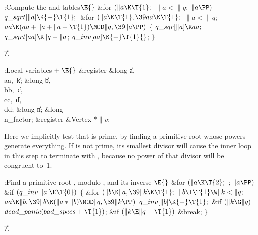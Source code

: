 \B{}:Compute the  and  tables\X${}\E{}$\6
\&{for} ${}(\|a\K\T{1};{}$ ${}\|a<\|q;{}$ ${}\|a\PP){}$\1\5
${}\\{q\_sqrt}[\|a]\K{-}\T{1};{}$\2\6
\&{for} ${}(\|a\K\T{1},\39\\{aa}\K\T{1};{}$ ${}\|a<\|q;{}$ ${}\\{aa}\K(\\{aa}+%
\|a+\|a+\T{1})\MOD\|q,\39\|a\PP){}$\5
${}\{{}$\1\6
${}\\{q\_sqr}[\|a]\K\\{aa};{}$\6
${}\\{q\_sqrt}[\\{aa}]\K\|q-\|a{}$;\6
${}\\{q\_inv}[\\{aa}]\K{-}\T{1}{}$;\6
\4${}\}{}$\2\par
\U7.\fi

\B{}:Local variables\X${}\mathrel+\E{}$\6
\&{register} \&{long} \|a${},{}$ \\{aa}${},{}$ \|k;\6
\&{long} \|b${},{}$ \\{bb}${},{}$ \|c${},{}$ \\{cc}${},{}$ \|d${},{}$ \\{dd};%
\6
\&{long} \|n;\6
\&{long} \\{n\_factor};%
\6
\&{register} \&{Vertex} ${}{*}\|v{}$;\par
\fi

Here we implicitly test that  is prime, by finding a primitive
root whose powers generate everything. If  is not prime, its smallest
divisor will cause the inner loop in this step to terminate with ,
because no power of that divisor will be congruent to~1.

\Y\B\4:Find a primitive root , modulo , and its inverse %
\X${}\E{}$\6
\&{for} ${}(\|a\K\T{2};{}$  ; ${}\|a\PP){}$\1\6
\&{if} ${}(\\{q\_inv}[\|a]\E\T{0}){}$\5
${}\{{}$\1\6
\&{for} ${}(\|b\K\|a,\39\|k\K\T{1};{}$ ${}\|b\I\T{1}\W\|k<\|q;{}$ ${}\\{aa}\K%
\|b,\39\|b\K(\|a*\|b)\MOD\|q,\39\|k\PP){}$\1\5
${}\\{q\_inv}[\|b]\K{-}\T{1};{}$\2\6
\&{if} ${}(\|k\G\|q){}$\1\5
${}\\{dead\_panic}(\\{bad\_specs}+\T{1}){}$;\2\6
\&{if} ${}(\|k\E\|q-\T{1}){}$\1\5
\&{break};\2\6
\4${}\}{}$\2\2\par
\U7.\fi

